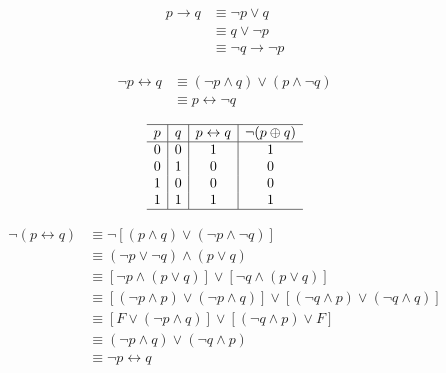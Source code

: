 {{        %
        \begin{practices}
            \begin{align*}
                p \rightarrow q
                &\equiv \neg p \vee q \\
                &\equiv q \vee \neg p \\
                &\equiv \neg q \rightarrow \neg p
            \end{align*}
        \end{practices}

        \begin{practices}
            \begin{align*}
                \neg p \leftrightarrow q
                &\equiv (\neg p \wedge q) \vee (p \wedge \neg q) \\
                &\equiv p \leftrightarrow \neg q
            \end{align*}
        \end{practices}

        \begin{practices}
            \begin{table}[H]
                \[
                    \begin{array}{c|c|c|c}
                        \hline
                        p & q & p \leftrightarrow q & \neg (p \oplus q)\\
                        \hline
                        0 & 0 & 1 & 1 \\
                        0 & 1 & 0 & 0 \\
                        1 & 0 & 0 & 0 \\
                        1 & 1 & 1 & 1 \\
                        \hline
                   \end{array}
               \]
            \end{table}
        \end{practices}

        \begin{practices}
            \begin{align*}
                \neg (p \leftrightarrow q)
                &\equiv \neg [(p \wedge q) \vee (\neg p \wedge \neg q)] \\
                &\equiv (\neg p \vee \neg q) \wedge (p \vee q) \\
                &\equiv [\neg p \wedge (p \vee q)] \vee [\neg q \wedge (p \vee q)] \\
                &\equiv [(\neg p \wedge p) \vee (\neg p \wedge q)] \vee [(\neg q \wedge p) \vee (\neg q \wedge q)] \\
                &\equiv [F \vee (\neg p \wedge q)] \vee [(\neg q \wedge p) \vee F] \\
                &\equiv (\neg p \wedge q) \vee (\neg q \wedge p) \\
                &\equiv \neg p \leftrightarrow q
            \end{align*}
        \end{practices}

}}
